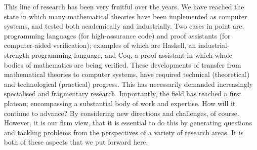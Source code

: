 \documentclass[11pt,twocolumn]{article}
\begin{document}
This line of research has been very fruitful over the years.  We have reached
the state in which many mathematical theories have been implemented as
computer systems, and tested both academically and industrially.  Two %
cases in point are: programming languages (for high-assurance code) and proof
assistants (for computer-aided verification); %
examples of which are 
Haskell, %
an industrial-strength programming language, 
and Coq, %
a proof assistant in which whole bodies of mathematics are being verified.
These developments of transfer from mathematical theories to computer systems,
have required %
technical (theoretical) and technological (practical) progress.  This has
necessarily demanded increasingly specialised and fragmentary research.  
Importantly, %
the field has reached a first plateau; encompassing a substantial body of work
and expertise.  How will it continue to advance?  By considering new
directions and challenges, of course.  However, it is our firm view, that it
is essential to do this by generating questions and tackling problems from the
perspectives of 
a variety of %
research areas.  It is both of these aspects that we put forward here.
\end{document}
